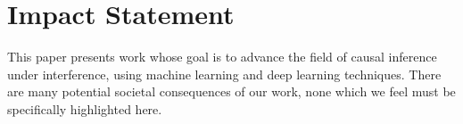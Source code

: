 \documentclass{article}
\theoremstyle{plain}
\theoremstyle{definition}
\theoremstyle{remark}
\begin{document}





\section*{Impact Statement}

This paper presents work whose goal is to advance the field of causal inference under interference, using machine learning and deep learning techniques. There are many potential societal consequences of our work, none which we feel must be specifically highlighted here.

\end{document}
